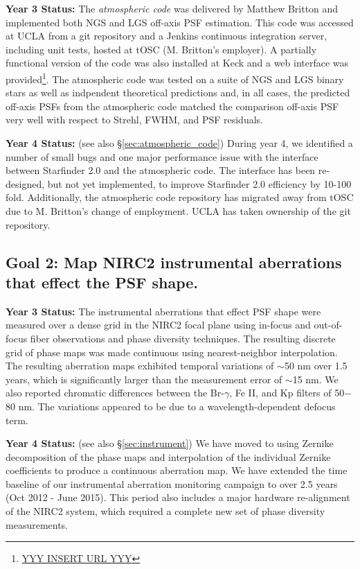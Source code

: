\noindent
\textbf{Year 3 Status:}
The {\em atmospheric code} was delivered by Matthew Britton and
implemented both NGS and LGS off-axis PSF estimation. This code was
accessed at UCLA from a git repository and a Jenkins continuous
integration server, including unit tests, hosted at tOSC
(M. Britton's employer). A partially functional version of the code
was also installed at Keck and a web interface was 
provided\footnote{\url{YYY INSERT URL YYY}}.
The atmospheric code was tested on a suite of NGS and LGS
binary stars as well as indpendent theoretical predictions and, in
all cases, the predicted off-axis PSFs from the atmospheric code
matched the comparison off-axis PSF very well with respect to
Strehl, FWHM, and PSF residuals. 

\noindent
\textbf{Year 4 Status:} (see also \S\ref{sec:atmospheric_code})
During year 4, we identified a number of small bugs and one major
performance issue with the interface between Starfinder 2.0 and the
atmospheric code. The interface has been re-designed, but not yet
implemented, to improve Starfinder 2.0 efficiency by 10-100
fold. Additionally, the atmospheric code repository has migrated away
from tOSC due to M. Britton's change of employment. UCLA has taken
ownership of the git repository. 


\subsection{Goal 2:  Map NIRC2 instrumental aberrations that effect the PSF
    shape.}

\noindent 
\textbf{Year 3 Status:}
The instrumental aberrations that effect PSF shape were measured over
a dense grid in the NIRC2 focal plane using in-focus and out-of-focus
fiber observations and phase diversity techniques. The resulting
discrete grid of phase maps was made continuous using nearest-neighbor
interpolation. The resulting aberration maps exhibited temporal
variations of $\sim$50 nm over 1.5 years, which is significantly
larger than the measurement error of $\sim$15 nm. We also reported 
chromatic differences between the Br-$\gamma$, Fe \textrm{II}, and Kp
filters of 50$-$80 nm. The variations appeared to be due to a
wavelength-dependent defocus term.
  
\noindent 
\textbf{Year 4 Status:} (see also \S\ref{sec:instrument})
We have moved to using Zernike decomposition of the phase maps and 
interpolation of the individual
Zernike coefficients to produce a continuous aberration map. 
We have extended the time baseline of our instrumental aberration
monitoring campaign to over 2.5 years (Oct 2012 - June 2015). This
period also includes a major hardware re-alignment of the NIRC2
system, which required a complete new set of phase diversity
measurements. 


